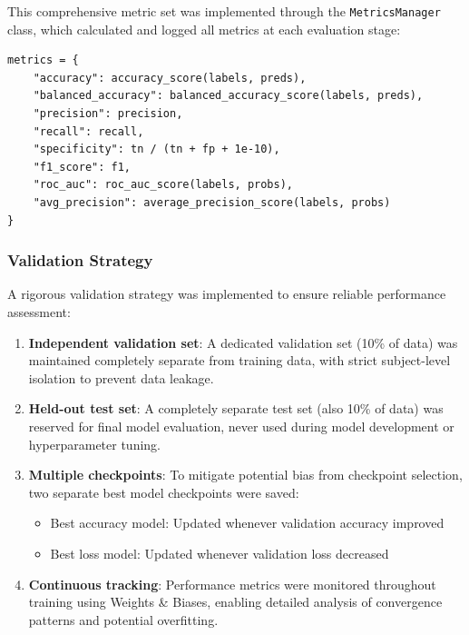 \documentclass[12pt, a4paper]{article}
\begin{document}
This comprehensive metric set was implemented through the \texttt{MetricsManager} class, which calculated and logged all metrics at each evaluation stage:

\begin{verbatim}
metrics = {
    "accuracy": accuracy_score(labels, preds),
    "balanced_accuracy": balanced_accuracy_score(labels, preds),
    "precision": precision,
    "recall": recall,
    "specificity": tn / (tn + fp + 1e-10),
    "f1_score": f1,
    "roc_auc": roc_auc_score(labels, probs),
    "avg_precision": average_precision_score(labels, probs)
}
\end{verbatim}

\subsubsection{Validation Strategy}

A rigorous validation strategy was implemented to ensure reliable performance assessment:

\begin{enumerate}
    \item \textbf{Independent validation set}: A dedicated validation set (10\% of data) was maintained completely separate from training data, with strict subject-level isolation to prevent data leakage.
    
    \item \textbf{Held-out test set}: A completely separate test set (also 10\% of data) was reserved for final model evaluation, never used during model development or hyperparameter tuning.
    
    \item \textbf{Multiple checkpoints}: To mitigate potential bias from checkpoint selection, two separate best model checkpoints were saved:
    \begin{itemize}
        \item Best accuracy model: Updated whenever validation accuracy improved
        \item Best loss model: Updated whenever validation loss decreased
    \end{itemize}
    
    \item \textbf{Continuous tracking}: Performance metrics were monitored throughout training using Weights \& Biases, enabling detailed analysis of convergence patterns and potential overfitting.
\end{enumerate}
\end{document}
